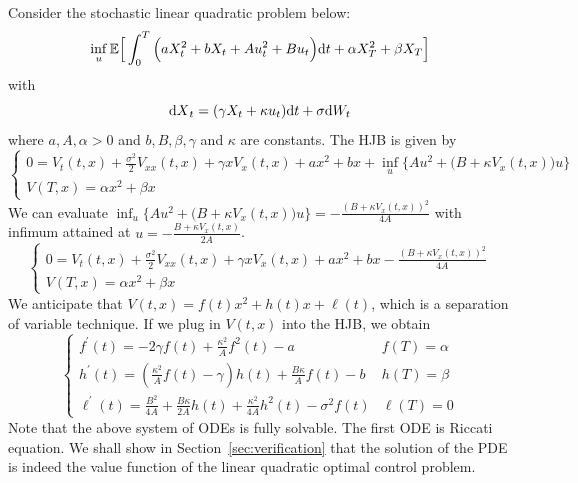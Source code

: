 \documentclass[11pt]{book}
\newcommand{\dt}{\text{\normalfont d}t}
\newcommand{\dX}{\text{\normalfont d}X}
\newcommand{\dW}{\text{\normalfont d}W}
\begin{document}
\begin{eg}\label{eg:LQ_drift}
    Consider the stochastic linear quadratic problem below:
    \begin{equation}
        \inf_u\mathbb{E}\Big[\int_0^T \Big(aX_t^2+bX_t +Au_t^2 + Bu_t\Big){\dt}+\alpha X_T^2+\beta X_T\Big]
    \end{equation}
    with
    \begin{equation}
        {\dX}_t=(\gamma X_t+\kappa u_t){\dt}+\sigma \dW_t
    \end{equation}
where $a,A, \alpha>0$ and $b,B,\beta,\gamma$ and $\kappa$ are constants. The HJB is given by 
\begin{equation}
    \begin{cases}
        0={V}_{t}(t,x) +\frac{\sigma^2}{2}V_{xx}(t,x)+ \gamma x V_{x}(t,x) + a x^2 + bx +\inf_{u}\Big\{Au^2 +\big(B+\kappa V_{x}(t,x)\big)u \Big\}\\
        V(T,x)=\alpha x^2 + \beta x
    \end{cases}
\end{equation}
We can evaluate
$\inf_u\{Au^2 +\big(B+\kappa V_{x}(t,x)\big)u\} = -\frac{(B+\kappa V_{x}(t,x))^2}{4A}$ with infimum attained at $u =-\frac{B+\kappa V_{x}(t,x)}{2A}$.
\begin{equation}
    \begin{cases}
        0={V}_{t}(t,x) +\frac{\sigma^2}{2}V_{xx}(t,x)+ \gamma x V_{x}(t,x) + a x^2 + bx -\frac{(B+\kappa V_{x}(t,x))^2}{4A}\\
        V(T,x)=\alpha x^2 + \beta x
    \end{cases}
\end{equation}
We anticipate that $V(t,x)=f(t)x^2+h(t)x+\ell(t)$, which is a separation of variable technique. If we plug in $V(t,x)$  into the HJB, we obtain
\begin{equation}
    \begin{cases}
       f^\prime(t) = -2\gamma f(t) + \frac{\kappa^2}{A}f^{2}(t) -a& f(T)=\alpha\\
       h^{\prime}(t)= (\frac{\kappa^2}{A}f(t)-\gamma)h(t)+\frac{B\kappa}{A}f(t)-b& h(T)=\beta\\
       \ell^{\prime}(t)=\frac{B^2}{4A}+\frac{B\kappa}{2A}h(t)+\frac{\kappa^2}{4A}h^2(t)-\sigma^2f(t)&\ell(T)=0
    \end{cases}
\end{equation}
Note that the above system of ODEs is fully solvable. The first ODE is Riccati equation.
We shall show in Section~\ref{sec:verification} that the solution of the PDE is indeed the value function of the linear quadratic optimal control problem.
\end{eg}
\end{document}
